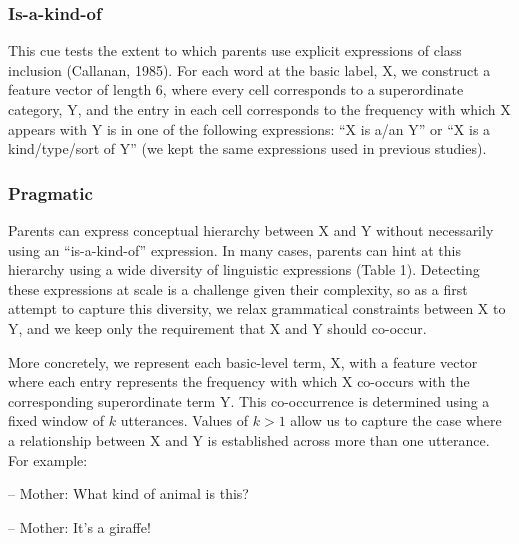 \documentclass[english,,man,floatsintext]{apa6}
\begin{document}
\hypertarget{is-a-kind-of}{%
\subsubsection{Is-a-kind-of}\label{is-a-kind-of}}

This cue tests the extent to which parents use explicit expressions of class inclusion (Callanan, 1985). For each word at the basic label, X,
we construct a feature vector of length 6, where every cell corresponds to a superordinate category, Y, and the entry in each cell corresponds to the frequency with which X appears with Y is in one of the following expressions: \enquote{X is a/an Y} or \enquote{X is a kind/type/sort of Y} (we kept the same expressions used in previous studies).

\hypertarget{pragmatic}{%
\subsubsection{Pragmatic}\label{pragmatic}}

Parents can express conceptual hierarchy between X and Y without
necessarily using an \enquote{is-a-kind-of} expression. In many cases, parents
can hint at this hierarchy using a wide diversity of
linguistic expressions (Table 1). Detecting these expressions at scale is a challenge given their complexity, so as a first attempt to capture this diversity, we relax
grammatical constraints between X to Y, and we keep only the requirement
that X and Y should co-occur.

More concretely, we represent each basic-level term, X, with a feature
vector where each entry represents the frequency with which X co-occurs
with the corresponding superordinate term Y. This co-occurrence is
determined using a fixed window of \(k\) utterances. Values of \(k > 1\)
allow us to capture the case where a relationship between X and Y is
established across more than one utterance. For example:

-- Mother: What kind of animal is this?

-- Mother: It's a giraffe!
\end{document}
